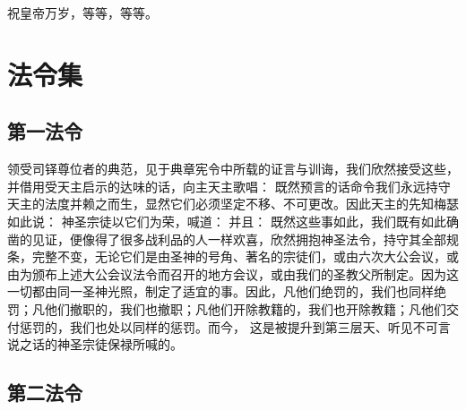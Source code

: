 祝皇帝万岁，等等，等等。\par


\section{法令集}


\subsection{第一法令}

\par

领受司铎尊位者的典范，见于典章宪令中所载的证言与训诲，我们欣然接受这些，并借用受天主启示的达味的话，向主天主歌唱：   既然预言的话命令我们永远持守天主的法度并赖之而生，显然它们必须坚定不移、不可更改。因此天主的先知梅瑟如此说： 神圣宗徒以它们为荣，喊道： 并且： 既然这些事如此，我们既有如此确凿的见证，便像得了很多战利品的人一样欢喜，欣然拥抱神圣法令，持守其全部规条，完整不变，无论它们是由圣神的号角、著名的宗徒们，或由六次大公会议，或由为颁布上述大公会议法令而召开的地方会议，或由我们的圣教父所制定。因为这一切都由同一圣神光照，制定了适宜的事。因此，凡他们绝罚的，我们也同样绝罚；凡他们撤职的，我们也撤职；凡他们开除教籍的，我们也开除教籍；凡他们交付惩罚的，我们也处以同样的惩罚。而今， 这是被提升到第三层天、听见不可言说之话的神圣宗徒保禄所喊的。\par

\par


\subsection{第二法令}

